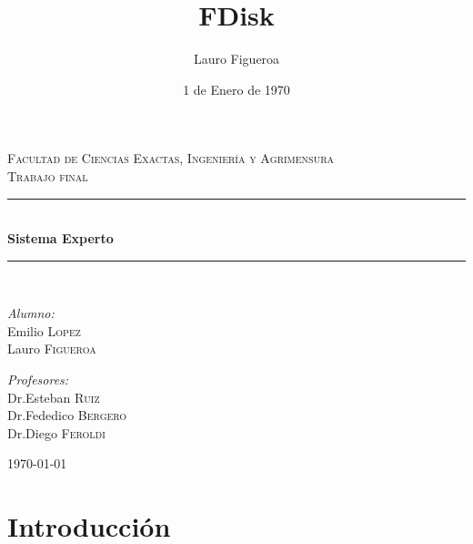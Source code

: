 \documentclass[11pt,oneside,a4paper]{article}
\title{FDisk}
\author{Lauro Figueroa}
\date{1 de Enero de 1970}
\newcommand{\HRule}{\rule{\linewidth}{0.5mm}}
\begin{document}
 
\begin{titlepage}
\begin{center}


\textsc{\LARGE Facultad de Ciencias Exactas, Ingeniería y Agrimensura}\\[1.5cm]

\textsc{\Large Trabajo final}\\[0.5cm]

\HRule \\[0.4cm]
{ \huge \bfseries Sistema Experto \\[0.4cm] }

\HRule \\[1.5cm]

\noindent
\begin{minipage}{0.4\textwidth}
\begin{flushleft} \large
\emph{Alumno:}\\
Emilio \textsc{Lopez}\\
Lauro \textsc{Figueroa}
\end{flushleft}
\end{minipage}%
\begin{minipage}{0.4\textwidth}
\begin{flushright} \large
\emph{Profesores:} \\
Dr.Esteban \textsc{Ruiz}\\
Dr.Fededico \textsc{Bergero}\\
Dr.Diego \textsc{Feroldi}
\end{flushright}
\end{minipage}

\vfill

{\large \today}

\end{center}
\end{titlepage}

\newpage 

\section*{Introducción}
\end{document}
